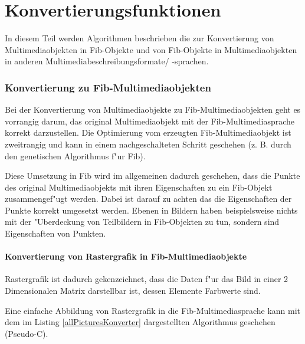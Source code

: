 %
%
%
%

\newpage
\part{Konvertierungsfunktionen}
\label{partFibConverter}

In diesem Teil werden Algorithmen beschrieben die zur Konvertierung von Multimediaobjekten in Fib-Objekte und von Fib-Objekte in Multimediaobjekten in anderen Multimediabeschreibungsformate/ -sprachen.

\section{Konvertierung zu Fib-Multimediaobjekten}

Bei der Konvertierung von Multimediaobjekte zu Fib-Multimediaobjekten geht es vorrangig darum, das original Multimediaobjekt mit der Fib-Multimediasprache korrekt darzustellen. Die Optimierung vom erzeugten Fib-Multimediaobjekt ist zweitrangig und kann in einem nachgeschalteten Schritt geschehen (z. B. durch den genetischen Algorithmus f"ur Fib).

Diese Umsetzung in Fib wird im allgemeinen dadurch geschehen, dass die Punkte des original Multimediaobjekts mit ihren Eigenschaften zu ein Fib-Objekt zusammengef"ugt werden. Dabei ist darauf zu achten das die Eigenschaften der Punkte korrekt umgesetzt werden.
Ebenen in Bildern haben beispielsweise nichts mit der "Uberdeckung von Teilbildern in Fib-Objekten zu tun, sondern sind Eigenschaften von Punkten.


\subsection{Konvertierung von Rastergrafik in Fib-Multimediaobjekte}

Rastergrafik ist dadurch gekenzeichnet, dass die Daten f"ur das Bild in einer 2 Dimensionalen Matrix darstellbar ist, dessen Elemente Farbwerte sind.

Eine einfache Abbildung von Rastergrafik in die Fib-Multimediasprache kann mit dem im Listing \ref{allPicturesKonverter} dargestellten Algorithmus geschehen (Pseudo-C).

